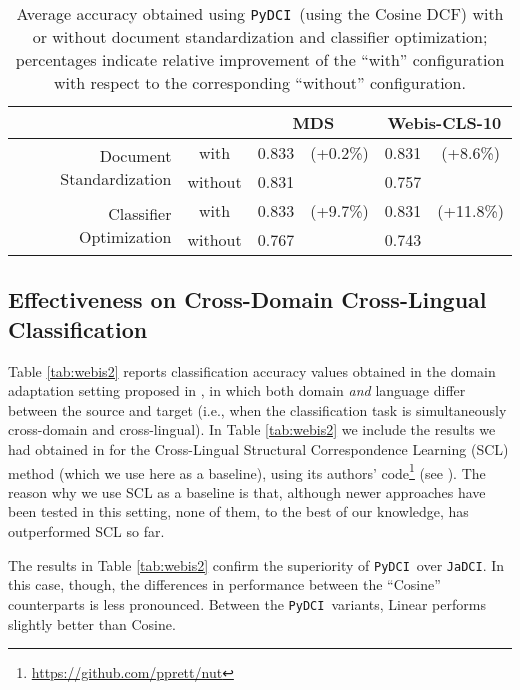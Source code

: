 \documentclass{article}
\newcommand{\jadci}{\texttt{JaDCI}}
\newcommand{\pydci}{\texttt{PyDCI}}
\begin{document}
\begin{table}[t]
  \begin{center}
    \begin{tabular}{|r|c||cc|cc|}
      \hline
      & & \multicolumn{2}{c|}{MDS} & \multicolumn{2}{c|}{Webis-CLS-10} \\
      \hline\hline
      \multirow{2}{*}{Document Standardization} & with    & 0.833 & (+0.2\%) & 0.831 & (+8.6\%) \\
      & without & 0.831 &          & 0.757 &    \\
      \hline
      \multirow{2}{*}{Classifier Optimization} & with    & 0.833 & (+9.7\%) & 0.831 & (+11.8\%) \\
      & without & 0.767 &          & 0.743 &    \\
      \hline
    \end{tabular}
  \end{center}
  \caption{\label{tab:modifications}Average accuracy obtained using
  \pydci\ (using the Cosine DCF) with or without document
  standardization and classifier optimization; percentages indicate
  relative improvement of the ``with'' configuration with respect to
  the corresponding ``without'' configuration.}
\end{table}



\subsection{Effectiveness on Cross-Domain Cross-Lingual
Classification}
\label{sec:CDCL}

\noindent Table \ref{tab:webis2} reports classification accuracy
values obtained in the domain adaptation setting proposed in
\citep{Moreo:2016fg}, in which both domain \emph{and} language differ
between the source and target (i.e., when the classification task is
simultaneously cross-domain and cross-lingual). In Table
\ref{tab:webis2} we include the results we had obtained in
\citep{Moreo:2016fg} for the Cross-Lingual Structural Correspondence
Learning (SCL) method \citep{Prettenhofer:2010ys} (which we use here
as a baseline), using its authors'
code\footnote{\url{https://github.com/pprett/nut}} (see
\citep{prettenhofer2011cross}). The reason why we use SCL as a
baseline is that, although newer approaches have been tested in this
setting, none of them, to the best of our knowledge, has outperformed
SCL so far.

The results in Table \ref{tab:webis2} confirm the superiority of
\pydci\ over \jadci. In this case, though, the differences in
performance between the ``Cosine'' counterparts is less pronounced.
Between the \pydci\ variants, Linear performs slightly better than
Cosine.
\end{document}
